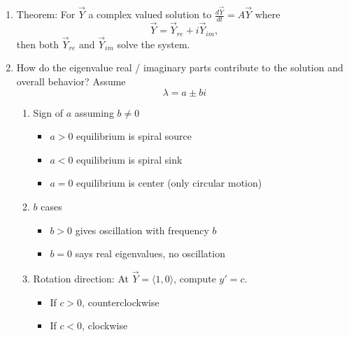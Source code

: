 \documentclass{article}
\newcommand{\ds}{\displaystyle}
\begin{document}
\begin{enumerate}
\item Theorem: For $\vec{Y}$ a complex valued solution to $\ds \frac{d\vec{Y}}{dt} = A \vec{Y}$ where
\[
\vec{Y} = \vec{Y}_{re} + i \vec{Y}_{im}, 
\]
then both $\vec{Y}_{re}$ and $\vec{Y}_{im}$ solve the system.

\item How do the eigenvalue real / imaginary parts contribute to the solution and overall behavior? Assume
\[
\lambda = a \pm b i
\]
\begin{enumerate}
\item Sign of $a$ assuming $b \neq 0$
\begin{itemize}
\item $a>0$ equilibrium is spiral source
\item $a<0$ equilibrium is spiral sink
\item $a=0$ equilibrium is center (only circular motion)
\end{itemize}
\item $b$ cases
\begin{itemize}
\item $b > 0$ gives oscillation with frequency $b$
\item $b=0$ says real eigenvalues, no oscillation
\end{itemize}
\item Rotation direction: At $\vec{Y}=\langle 1,0 \rangle$, compute $y'=c$.
\begin{itemize}
\item If $c>0$, counterclockwise
\item If $c<0$, clockwise
\end{itemize}
\end{enumerate}


\end{enumerate}
\end{document}
